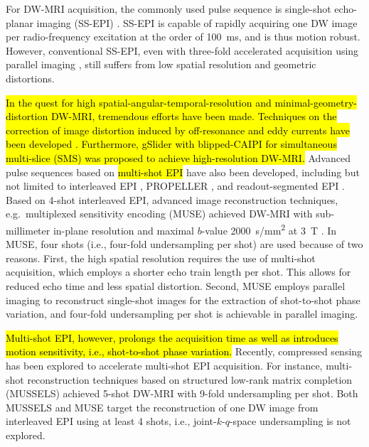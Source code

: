 \documentclass[preprint,12pt,authoryear,review]{elsarticle}
\begin{document}
    For DW-MRI acquisition, the commonly used pulse sequence is
    single-shot echo-planar imaging (SS-EPI) \citep{mansfield_1977_epi}.
    SS-EPI is capable of rapidly acquiring one DW image per radio-frequency excitation
    at the order of \SI{100}{\ms}, and is thus motion robust.
    However, conventional SS-EPI,
    even with three-fold accelerated acquisition \citep{bammer_2001_epi_sense}
    using parallel imaging
    \citep{roemer_1990_pi,ra_1993_sense,pruessmann_1999_sense,griswold_2002_grappa},
    still suffers from low spatial resolution and geometric distortions.

    \hl{In the quest for high spatial-angular-temporal-resolution
    and minimal-geometry-distortion DW-MRI,
    tremendous efforts have been made.
    Techniques on the correction of image distortion
    induced by off-resonance and eddy currents
    have been developed \mbox{\citep{andersson_2003_topup}}.
    Furthermore, gSlider \mbox{\citep{setsompop_2018_gslider}} with
    blipped-CAIPI \mbox{\citep{setsompop_2012_blipped}}
    for simultaneous multi-slice (SMS)
    \mbox{\citep{maudsley_1980_sms,breuer_2005_caipi}}
    was proposed to achieve high-resolution DW-MRI.}
    Advanced pulse sequences based on
    \hl{multi-shot EPI} have also been developed, 
    including but not limited to interleaved EPI \citep{butts_1993_iepi},
    PROPELLER \citep{pipe_2002_blade}, and
    readout-segmented EPI \citep{porter_2009_resolve,heidemann_2010_resolve7t}.
    Based on 4-shot interleaved EPI, advanced image reconstruction techniques,
    e.g.~multiplexed sensitivity encoding (MUSE)
    achieved DW-MRI with sub-millimeter in-plane resolution
    and maximal $b$-value \SI{2000}{s/mm^2} at \SI{3}{\tesla} \citep{chen_2013_muse}.
    In MUSE, four shots (i.e., four-fold undersampling per shot)
    are used because of two reasons.
    First, the high spatial resolution requires the use of multi-shot acquisition,
    which employs a shorter echo train length per shot.
    This allows for reduced echo time and less spatial distortion.
    Second, MUSE employs parallel imaging to reconstruct single-shot images
    for the extraction of shot-to-shot phase variation,
    and four-fold undersampling per shot is achievable in parallel imaging.

    \hl{Multi-shot EPI, however, prolongs the acquisition time as well as
    introduces motion sensitivity, i.e., shot-to-shot phase variation.}
    Recently, compressed sensing \citep{lustig_2007_cs,block_2007_cs}
    has been explored to accelerate multi-shot EPI acquisition.
    For instance, multi-shot reconstruction techniques
    based on structured low-rank matrix completion (MUSSELS)
    \citep{mani_2017_mussels,bilgic_2019_neatr} achieved
    5-shot DW-MRI with 9-fold undersampling per shot.
    Both MUSSELS and MUSE target the reconstruction of one DW image
    from interleaved EPI using at least 4 shots,
    i.e., joint-$k$-$q$-space undersampling is not explored.
\end{document}
